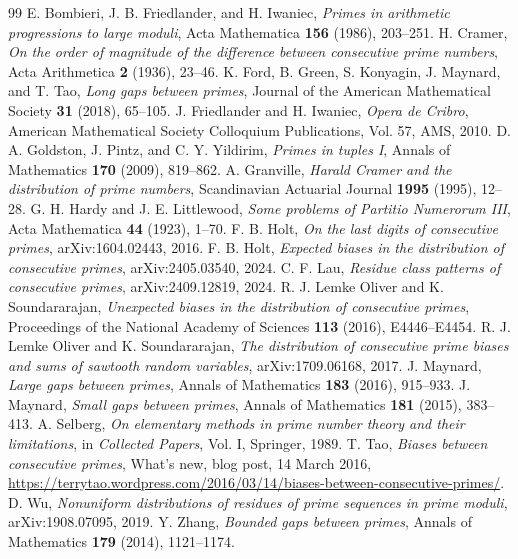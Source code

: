 \documentclass[10pt]{article}
\begin{document}
\begin{thebibliography}{99}
 E. Bombieri, J. B. Friedlander, and H. Iwaniec, \emph{Primes in arithmetic progressions to large moduli}, Acta Mathematica \textbf{156} (1986), 203--251.
 H. Cramer, \emph{On the order of magnitude of the difference between consecutive prime numbers}, Acta Arithmetica \textbf{2} (1936), 23--46.
 K. Ford, B. Green, S. Konyagin, J. Maynard, and T. Tao, \emph{Long gaps between primes}, Journal of the American Mathematical Society \textbf{31} (2018), 65--105.
 J. Friedlander and H. Iwaniec, \emph{Opera de Cribro}, American Mathematical Society Colloquium Publications, Vol. 57, AMS, 2010.
 D. A. Goldston, J. Pintz, and C. Y. Yildirim, \emph{Primes in tuples I}, Annals of Mathematics \textbf{170} (2009), 819--862.
 A. Granville, \emph{Harald Cramer and the distribution of prime numbers}, Scandinavian Actuarial Journal \textbf{1995} (1995), 12--28.
 G. H. Hardy and J. E. Littlewood, \emph{Some problems of Partitio Numerorum III}, Acta Mathematica \textbf{44} (1923), 1--70.
 F. B. Holt, \emph{On the last digits of consecutive primes}, arXiv:1604.02443, 2016.
 F. B. Holt, \emph{Expected biases in the distribution of consecutive primes}, arXiv:2405.03540, 2024.
 C. F. Lau, \emph{Residue class patterns of consecutive primes}, arXiv:2409.12819, 2024.
 R. J. Lemke Oliver and K. Soundararajan, \emph{Unexpected biases in the distribution of consecutive primes}, Proceedings of the National Academy of Sciences \textbf{113} (2016), E4446--E4454.
 R. J. Lemke Oliver and K. Soundararajan, \emph{The distribution of consecutive prime biases and sums of sawtooth random variables}, arXiv:1709.06168, 2017.
 J. Maynard, \emph{Large gaps between primes}, Annals of Mathematics \textbf{183} (2016), 915--933.
 J. Maynard, \emph{Small gaps between primes}, Annals of Mathematics \textbf{181} (2015), 383--413.
 A. Selberg, \emph{On elementary methods in prime number theory and their limitations}, in \emph{Collected Papers}, Vol. I, Springer, 1989.
 T. Tao, \emph{Biases between consecutive primes}, What's new, blog post, 14 March 2016, \url{https://terrytao.wordpress.com/2016/03/14/biases-between-consecutive-primes/}.
 D. Wu, \emph{Nonuniform distributions of residues of prime sequences in prime moduli}, arXiv:1908.07095, 2019.
 Y. Zhang, \emph{Bounded gaps between primes}, Annals of Mathematics \textbf{179} (2014), 1121--1174.
\end{thebibliography}
\end{document}
